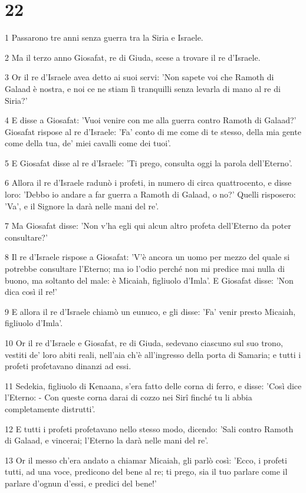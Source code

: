 \chapter{22}

\par 1 Passarono tre anni senza guerra tra la Siria e Israele.
\par 2 Ma il terzo anno Giosafat, re di Giuda, scese a trovare il re d'Israele.
\par 3 Or il re d'Israele avea detto ai suoi servi: 'Non sapete voi che Ramoth di Galaad è nostra, e noi ce ne stiam lì tranquilli senza levarla di mano al re di Siria?'
\par 4 E disse a Giosafat: 'Vuoi venire con me alla guerra contro Ramoth di Galaad?' Giosafat rispose al re d'Israele: 'Fa' conto di me come di te stesso, della mia gente come della tua, de' miei cavalli come dei tuoi'.
\par 5 E Giosafat disse al re d'Israele: 'Ti prego, consulta oggi la parola dell'Eterno'.
\par 6 Allora il re d'Israele radunò i profeti, in numero di circa quattrocento, e disse loro: 'Debbo io andare a far guerra a Ramoth di Galaad, o no?' Quelli risposero: 'Va', e il Signore la darà nelle mani del re'.
\par 7 Ma Giosafat disse: 'Non v'ha egli qui alcun altro profeta dell'Eterno da poter consultare?'
\par 8 Il re d'Israele rispose a Giosafat: 'V'è ancora un uomo per mezzo del quale si potrebbe consultare l'Eterno; ma io l'odio perché non mi predice mai nulla di buono, ma soltanto del male: è Micaiah, figliuolo d'Imla'. E Giosafat disse: 'Non dica così il re!'
\par 9 E allora il re d'Israele chiamò un eunuco, e gli disse: 'Fa' venir presto Micaiah, figliuolo d'Imla'.
\par 10 Or il re d'Israele e Giosafat, re di Giuda, sedevano ciascuno sul suo trono, vestiti de' loro abiti reali, nell'aia ch'è all'ingresso della porta di Samaria; e tutti i profeti profetavano dinanzi ad essi.
\par 11 Sedekia, figliuolo di Kenaana, s'era fatto delle corna di ferro, e disse: 'Così dice l'Eterno: - Con queste corna darai di cozzo nei Sirî finché tu li abbia completamente distrutti'.
\par 12 E tutti i profeti profetavano nello stesso modo, dicendo: 'Sali contro Ramoth di Galaad, e vincerai; l'Eterno la darà nelle mani del re'.
\par 13 Or il messo ch'era andato a chiamar Micaiah, gli parlò così: 'Ecco, i profeti tutti, ad una voce, predicono del bene al re; ti prego, sia il tuo parlare come il parlare d'ognun d'essi, e predici del bene!'
